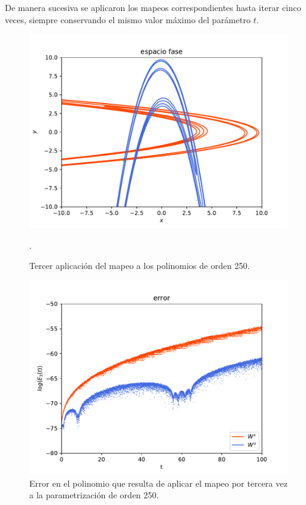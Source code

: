 De manera sucesiva se aplicaron los mapeos correspondientes hasta iterar cinco veces, siempre conservando el mismo valor máximo del parámetro $t$.
\begin{figure}[H]
\centering
\includegraphics[scale=0.7]{rectangulo3.pdf}
\caption{Tercer aplicación del mapeo a los polinomios de orden 250.}.
\label{Rectangulo3}
\end{figure}

\begin{figure}[H]
\centering
\includegraphics[scale=0.7]{error3ite.pdf}
\caption{Error en el polinomio que resulta de aplicar el mapeo por tercera vez a la parametrización de orden 250.}
\label{error-3iteracion}
\end{figure}


